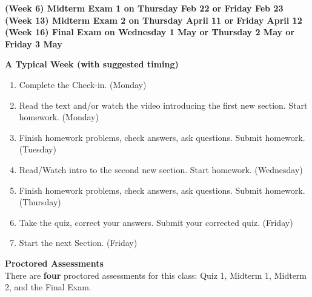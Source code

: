 \documentclass[12pt]{article}
\renewcommand{\emph}[1]{\textsf{\textbf{#1}}}
\newcommand{\localhead}[1]{\par\smallskip\textbf{#1} \smallskip\nobreak\\}%
\def\heading#1{\localhead{\large\emph{#1}}}
\begin{document}
\emph{(Week 6) Midterm Exam 1 on Thursday Feb 22 or Friday Feb 23} \\
\emph{(Week 13) Midterm Exam 2 on Thursday April 11 or Friday April 12}  \\
\emph{(Week 16) Final Exam on Wednesday 1 May or Thursday 2 May or Friday 3 May}\\ 

\heading{A Typical Week (with suggested timing)}
\vspace*{-.2in}
\begin{enumerate}
\item Complete the Check-in. (Monday) 
\item Read the text and/or watch the video introducing the first new section. Start homework.  (Monday)
\item Finish homework problems, check answers, ask questions. Submit homework.  (Tuesday)
\item Read/Watch intro to the second new section. Start homework.  (Wednesday)
\item Finish homework problems, check answers, ask questions. Submit homework. (Thursday)
\item Take the quiz, correct your answers. Submit your corrected quiz.  (Friday)
\item Start the next Section. (Friday)
\end{enumerate}

\heading{Proctored Assessments}
There are \emph{four} proctored assessments for this class:
Quiz 1, Midterm 1, Midterm 2, and the Final Exam. 
\end{document}
